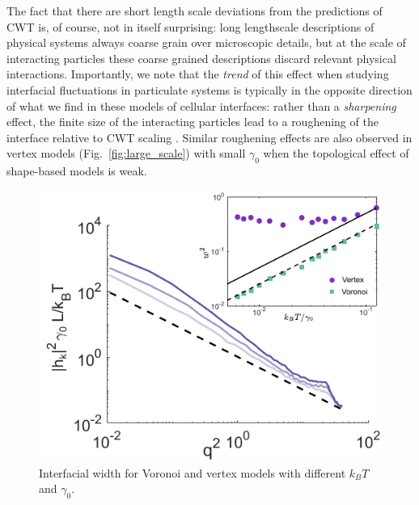 \documentclass[twoside,twocolumn,9pt]{article}
\begin{document}
The fact that there are short length scale deviations from the predictions of CWT is, of course, not in itself surprising: long lengthscale descriptions of physical systems always coarse grain over microscopic details, but at the scale of interacting particles these coarse grained descriptions discard relevant physical interactions. Importantly, we note that the \emph{trend} of this effect when studying interfacial fluctuations in particulate systems is typically in the opposite direction of what we find in these models of cellular interfaces: rather than a \emph{sharpening} effect, the finite size of the interacting particles lead to a roughening of the interface relative to CWT scaling \cite{willis2010thermal,shang2011fluctuating,del2019interface}. Similar roughening effects are also observed in vertex models (Fig.~\ref{fig:large_scale}) with small $\gamma_0$ when the topological effect of shape-based models is weak. 

\begin{figure}[t]
    \centering
    \includegraphics[width=0.9\columnwidth]{Figure5.pdf}
    \caption{Interfacial width for Voronoi and vertex models with different $k_BT$ and $\gamma_0$. } 
    \label{fig:vertex}
\end{figure}
\end{document}
